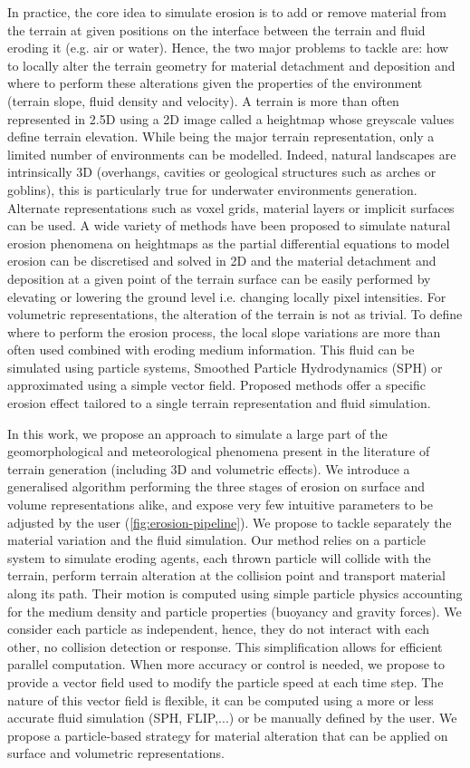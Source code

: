 In practice, the core idea to simulate erosion is to add or remove material from the terrain at given positions on the interface between the terrain and fluid eroding it (e.g. air or water). Hence, the two major problems to tackle are: how to locally alter the terrain geometry for material detachment and deposition and where to perform these alterations given the properties of the environment (terrain slope, fluid density and velocity).
A terrain is more than often represented in 2.5D using a 2D image called a heightmap whose greyscale values define terrain elevation. While being the major terrain representation, only a limited number of environments can be modelled. Indeed, natural landscapes are intrinsically 3D (overhangs, cavities or geological structures such as arches or goblins), this is particularly true for underwater environments generation. Alternate representations such as voxel grids, material layers or implicit surfaces can be used. A wide variety of methods have been proposed to simulate natural erosion phenomena on heightmaps as the partial differential equations to model erosion can be discretised and solved in 2D and the material detachment and deposition at a given point of the terrain surface can be easily performed by elevating or lowering the ground level i.e. changing locally pixel intensities.
For volumetric representations, the alteration of the terrain is not as trivial.
To define where to perform the erosion process, the local slope variations are more than often used combined with eroding medium information. This fluid can be simulated using particle systems, Smoothed Particle Hydrodynamics (SPH) \cite{Kristof2009} or approximated using a simple vector field.
Proposed methods offer a specific erosion effect tailored to a single terrain representation and fluid simulation.

In this work, we propose an approach to simulate a large part of the geomorphological and meteorological phenomena present in the literature of terrain generation (including 3D and volumetric effects). We introduce a generalised algorithm performing the three stages of erosion on surface and volume representations alike, and expose very few intuitive parameters to be adjusted by the user (\cref{fig:erosion-pipeline}).
We propose to tackle separately the material variation and the fluid simulation. Our method relies on a particle system to simulate eroding agents, each thrown particle will collide with the terrain, perform terrain alteration at the collision point and transport material along its path.
Their motion is computed using simple particle physics accounting for the medium density and particle properties (buoyancy and gravity forces). We consider each particle as independent, hence, they do not interact with each other, no collision detection or response. This simplification allows for efficient parallel computation.
When more accuracy or control is needed, we propose to provide a vector field used to modify the particle speed at each time step. The nature of this vector field is flexible, it can be computed using a more or less accurate fluid simulation (SPH, FLIP,...) or be manually defined by the user. We propose a particle-based strategy for material alteration that can be applied on surface and volumetric representations.

